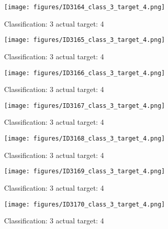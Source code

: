 \begin{figure}[h!]
\begin{center}
\texttt{[image: figures/ID3164\_class\_3\_target\_4.png]}
\end{center}
\caption{ Classification: 3 actual target: 4}
\label{fig:ID3164_class_3_target_4}
\end{figure}
\begin{figure}[h!]
\begin{center}
\texttt{[image: figures/ID3165\_class\_3\_target\_4.png]}
\end{center}
\caption{ Classification: 3 actual target: 4}
\label{fig:ID3165_class_3_target_4}
\end{figure}
\begin{figure}[h!]
\begin{center}
\texttt{[image: figures/ID3166\_class\_3\_target\_4.png]}
\end{center}
\caption{ Classification: 3 actual target: 4}
\label{fig:ID3166_class_3_target_4}
\end{figure}
\begin{figure}[h!]
\begin{center}
\texttt{[image: figures/ID3167\_class\_3\_target\_4.png]}
\end{center}
\caption{ Classification: 3 actual target: 4}
\label{fig:ID3167_class_3_target_4}
\end{figure}
\begin{figure}[h!]
\begin{center}
\texttt{[image: figures/ID3168\_class\_3\_target\_4.png]}
\end{center}
\caption{ Classification: 3 actual target: 4}
\label{fig:ID3168_class_3_target_4}
\end{figure}
\begin{figure}[h!]
\begin{center}
\texttt{[image: figures/ID3169\_class\_3\_target\_4.png]}
\end{center}
\caption{ Classification: 3 actual target: 4}
\label{fig:ID3169_class_3_target_4}
\end{figure}
\begin{figure}[h!]
\begin{center}
\texttt{[image: figures/ID3170\_class\_3\_target\_4.png]}
\end{center}
\caption{ Classification: 3 actual target: 4}
\label{fig:ID3170_class_3_target_4}
\end{figure}
